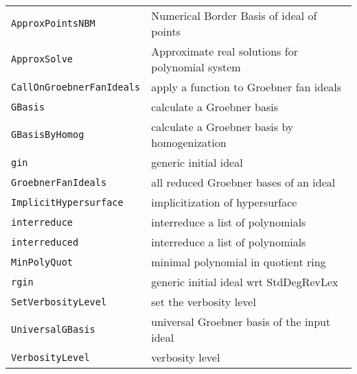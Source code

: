 \documentclass[a4paper]{mybook}
\begin{document}
\begin{center}
\begin{longtable}{ll}
   
{\verb~ApproxPointsNBM~} &
      Numerical Border Basis of ideal of points\\
   
{\verb~ApproxSolve~} &
      Approximate real solutions for polynomial system\\
   
{\verb~CallOnGroebnerFanIdeals~} &
      apply a function to Groebner fan ideals\\
   
{\verb~GBasis~} &
      calculate a Groebner basis\\
   
{\verb~GBasisByHomog~} &
      calculate a Groebner basis by homogenization\\
   
{\verb~gin~} &
      generic initial ideal\\
   
{\verb~GroebnerFanIdeals~} &
      all reduced Groebner bases of an ideal\\
   
{\verb~ImplicitHypersurface~} &
      implicitization of hypersurface\\
   
{\verb~interreduce~} &
      interreduce a list of polynomials\\
   
{\verb~interreduced~} &
      interreduce a list of polynomials\\
   
{\verb~MinPolyQuot~} &
      minimal polynomial in quotient ring\\
   
{\verb~rgin~} &
      generic initial ideal wrt StdDegRevLex\\
   
{\verb~SetVerbosityLevel~} &
      set the verbosity level\\
   
{\verb~UniversalGBasis~} &
      universal Groebner basis of the input ideal\\
   
{\verb~VerbosityLevel~} &
      verbosity level\\
   
\end{longtable}
\end{center}

\noindent
\end{document}
